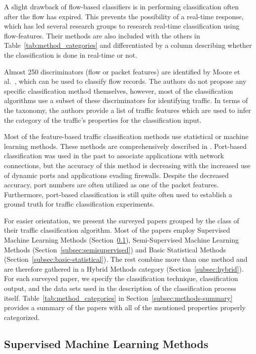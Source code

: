A slight drawback of flow-based classifiers is in performing classification often after the flow has expired. This prevents the possibility of a real-time response, which has led several research groups to research real-time classification using flow-features. Their methods are also included with the others in Table~\ref{tab:method_categories} and differentiated by a column describing whether the classification is done in real-time or not.

Almost 250 discriminators (flow or packet features) are identified by Moore et al.~\cite{Moore-2005-Discriminators}, which can be used to classify flow records. The authors do not propose any specific classification method themselves, however, most of the classification algorithms use a subset of these discriminators for identifying traffic. In terms of the taxonomy, the authors provide a list of traffic features which are used to infer the category of the traffic's properties for the classification input.

Most of the feature-based traffic classification methods use statistical or machine learning methods. These methods are comprehensively described in \cite{Alpaydin-2010-Introduction}. Port-based classification was used in the past to associate applications with network connections, but the accuracy of this method is decreasing with the increased use of dynamic ports and applications evading firewalls. Despite the decreased accuracy, port numbers are often utilized as one of the packet features. Furthermore, port-based classification is still quite often used to establish a ground truth for traffic classification experiments.

For easier orientation, we present the surveyed papers grouped by the class of their traffic classification algorithm. Most of the papers employ Supervised Machine Learning Methods (Section~\ref{subsec:supervised}), Semi-Supervised Machine Learning Methods (Section~\ref{subsec:semisupervised}) and Basic Statistical Methods (Section~\ref{subsec:basic-statistical}). The rest combine more than one method and are therefore gathered in a Hybrid Methods category (Section~\ref{subsec:hybrid}). For each surveyed paper, we specify the classification technique, classification output, and the data sets used in the description of the classification process itself. Table~\ref{tab:method_categories} in Section~\ref{subsec:methods-summary} provides a summary of the papers with all of the mentioned properties properly categorized.

\subsection{Supervised Machine Learning Methods}\label{subsec:supervised}

